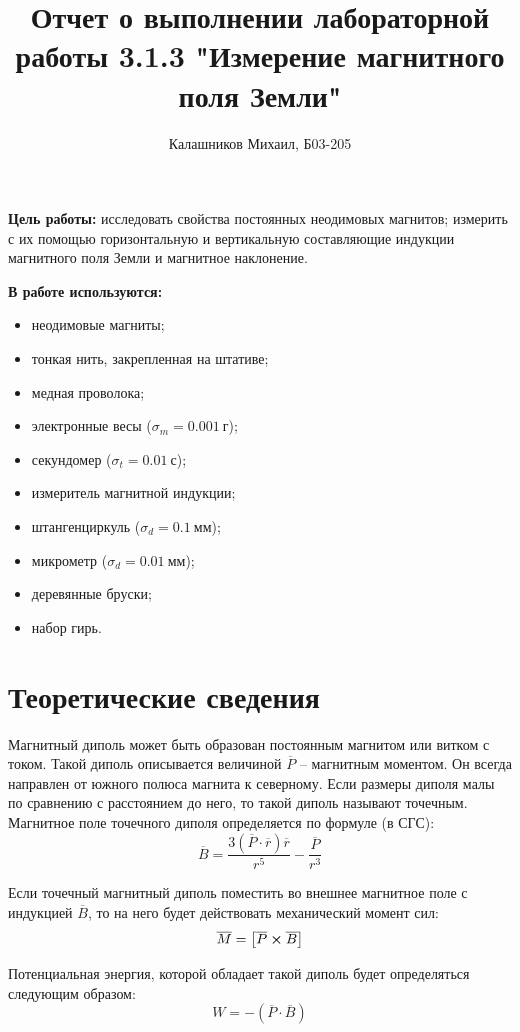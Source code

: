 \documentclass[14pt, a4paper]{report}
\title{\textbf{Отчет о выполнении лабораторной работы 3.1.3 "Измерение магнитного поля Земли"}}
\author{Калашников Михаил, Б03-205}
\date{}
\begin{document}
\maketitle

\textbf{Цель работы:}
исследовать свойства постоянных неодимовых магнитов; измерить с их помощью горизонтальную и вертикальную составляющие индукции магнитного поля Земли и магнитное наклонение.
\newline

\textbf{В работе используются:}
\begin{itemize}
\item неодимовые магниты;
\item тонкая нить, закрепленная на штативе;
\item медная проволока;
\item электронные весы ($\sigma_m=0.001\ г$);
\item секундомер ($\sigma_t=0.01\ с$);
\item измеритель магнитной индукции;
\item штангенциркуль ($\sigma_d=0.1\ мм$);
\item микрометр ($\sigma_d=0.01\ мм$);
\item деревянные бруски;
\item набор гирь.
\end{itemize}

\section{Теоретические сведения}

Магнитный диполь может быть образован постоянным магнитом или витком с током. Такой диполь описывается величиной $\overline{P}$ -- магнитным моментом. Он всегда направлен от южного полюса магнита к северному. Если размеры диполя малы по сравнению с расстоянием до него, то такой диполь называют точечным.
Магнитное поле точечного диполя определяется по формуле (в СГС):
\[\overline{B}=\frac{3\left(\overline{P}\cdot\overline{r}\right)\overline{r}}{r^5}-\frac{\overline{P}}{r^3}\]

Если точечный магнитный диполь поместить во внешнее магнитное поле с индукцией $\overline{B}$, то на него будет действовать механический момент сил:
\[\overline{M}=\left[\overline{P}\cross\overline{B}\right]\]

Потенциальная энергия, которой обладает такой диполь будет определяться следующим образом:
\[W=-\left(\overline{P}\cdot\overline{B}\right)\]
\end{document}
